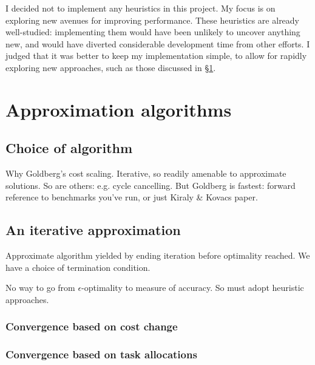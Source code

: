 I decided not to implement any heuristics in this project. My focus is on exploring new avenues for improving performance. These heuristics are already well-studied: implementing them would have been unlikely to uncover anything new, and would have diverted considerable development time from other efforts. I judged that it was better to keep my implementation simple, to allow for rapidly exploring new approaches, such as those discussed in \S\ref{sec:impl-approx}.


\section{Approximation algorithms} \label{sec:impl-approx}

\subsection{Choice of algorithm} \label{sec:impl-approx-choice}

Why Goldberg's cost scaling. Iterative, so readily amenable to approximate solutions. So are others: e.g. cycle cancelling. But Goldberg is fastest: forward reference to benchmarks you've run, or just Kiraly \& Kovacs paper.

\subsection{An iterative approximation}

Approximate algorithm yielded by ending iteration before optimality reached. We have a choice of termination condition.

No way to go from $\epsilon$-optimality to measure of accuracy. So must adopt heuristic approaches.

\subsubsection{Convergence based on cost change}

\subsubsection{Convergence based on task allocations}

